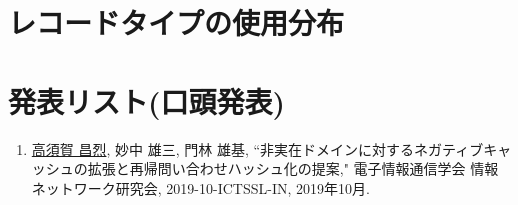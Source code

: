 \documentclass[12pt]{jarticle} %
\begin{document}
\newpage




\appendix

\section{レコードタイプの使用分布}


\newpage
\section{発表リスト(口頭発表)}
\begin{enumerate}
 \item \underline{高須賀 昌烈}, 妙中 雄三, 門林 雄基, ``非実在ドメインに対するネガティブキャッシュの拡張と再帰問い合わせハッシュ化の提案," 電子情報通信学会 情報ネットワーク研究会, 2019-10-ICTSSL-IN, 2019年10月.
\end{enumerate}
\end{document}
